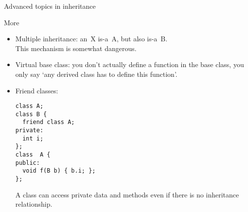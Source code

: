  {Advanced topics in inheritance}

\begin{block}{More}
  \label{sl:obj-more}  
  \begin{itemize}
  \item  Multiple inheritance: an~X is-a~A, but also is-a~B.\\
    This mechanism is somewhat dangerous.
  \item Virtual base class: you don't actually define a function in
    the base class, you only say `any derived class has to define this
    function'.
  \item Friend classes:
\begin{verbatim}
class A;
class B {
  friend class A;
private:
  int i;
};
class  A {
public: 
  void f(B b) { b.i; };
};
\end{verbatim}
  A  class can access private data and methods
  even if there is no inheritance relationship.
  \end{itemize}
\end{block}

